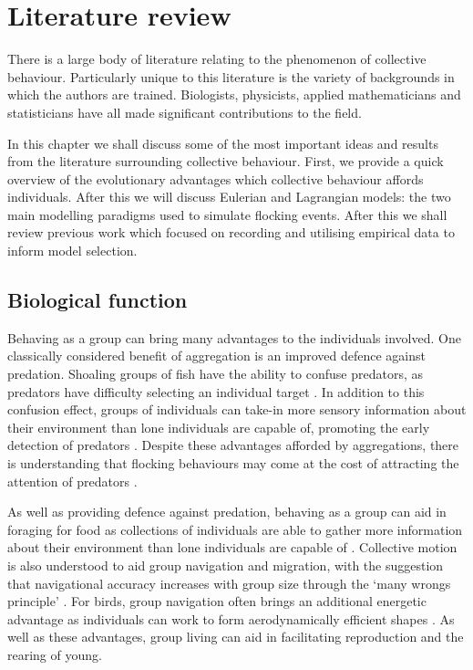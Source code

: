 \graphicspath{{fig/lit_review/}}

\chapter{Literature review}
\label{cha:lit_review}

There is a large body of literature relating to the phenomenon of collective behaviour.
Particularly unique to this literature is the variety of backgrounds in which the authors
are trained. Biologists, physicists, applied mathematicians and statisticians have all
made significant contributions to the field.

In this chapter we shall discuss some of the most important ideas and results from the
literature surrounding collective behaviour. First, we provide a quick overview of the
evolutionary advantages which collective behaviour affords individuals. After this we will
discuss Eulerian and Lagrangian models: the two main modelling paradigms used to simulate
flocking events. After this we shall review previous work which focused on recording and
utilising empirical data to inform model selection.

\section{Biological function}
\label{sec:biological_function}

Behaving as a group can bring many advantages to the individuals involved. One classically
considered benefit of aggregation is an improved defence against predation. Shoaling
groups of fish have the ability to confuse predators, as predators have difficulty
selecting an individual target \parencite{landeau86}. In addition to this confusion
effect, groups of individuals can take-in more sensory information about their environment
than lone individuals are capable of, promoting the early detection of predators
\parencite{pitcher93}. Despite these advantages afforded by aggregations, there is
understanding that flocking behaviours may come at the cost of attracting the attention of 
predators \parencite{wittenberger85}.

As well as providing defence against predation, behaving as a group can aid in foraging
for food as collections of individuals are able to gather more information about their
environment than lone individuals are capable of \parencite{clark86}. Collective motion is
also understood to aid group navigation and migration, with the suggestion that
navigational accuracy increases with group size through the `many wrongs principle'
\parencite{simmons04}. For birds, group navigation often brings an additional energetic
advantage as individuals can work to form aerodynamically efficient shapes
\parencite{weimerskirch01}. As well as these advantages, group living can aid in
facilitating reproduction and the rearing of young.

